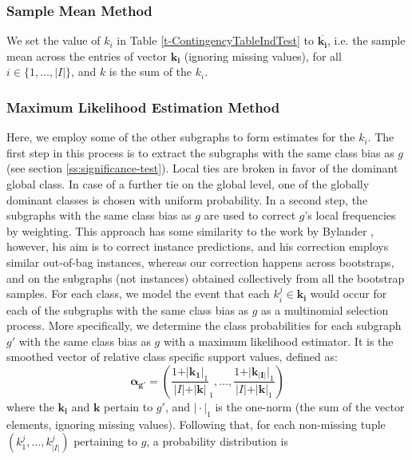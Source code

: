 \documentclass{sig-alternate}
\begin{document}
\subsubsection{Sample Mean Method}
\label{ss:simple-mean}
We set the value of $k_i$ in Table \ref{t-ContingencyTableIndTest} to
$\overline{\mathbf{k_i}}$, i.e. the sample mean
across the entries of vector $\mathbf{k_i}$ (ignoring missing values), for all $i \in \{1,\ldots,|I|\}$,
and $k$ is the sum of the $k_i$.

\subsubsection{Maximum Likelihood Estimation Method}
\label{ss:MLE}
Here, we employ some of the other subgraphs to form estimates for the $k_i$.
The first step in this process is to extract the subgraphs with the same class
bias as $g$ (see section \ref{ss:significance-test}).  Local ties are broken in
favor of the dominant global class. In case of a further tie on the global
level, one of the globally dominant classes is chosen with uniform probability.
In a second step, the subgraphs with the same class bias as $g$ are used to correct
$g$'s local frequencies by weighting. This approach has some similarity to the
work by Bylander \cite{bylander02estimating}, however, his aim is to correct
instance predictions, and his correction employs similar out-of-bag instances,
whereas our correction happens across bootstraps, and on the subgraphs (not
instances) obtained collectively from all the bootstrap samples.  For each
class, we model the event that each $k_i^j \in \mathbf{k_i}$ would occur for
each of the subgraphs with the same class bias as $g$ as a multinomial
selection process.  More specifically, we determine the class probabilities for
each subgraph $g'$ with the same class bias as $g$ with a maximum likelihood
estimator. It is the smoothed vector of relative class specific support values,
defined as:
\begin{equation}
  \mathbf{\alpha_{g'}} = \left(\frac{1+\vert\mathbf{k_1}\vert_1}{\vert I\vert+\vert\mathbf{k}\vert}_1,\ldots,\frac{1+\vert\mathbf{k_{\vert I\vert}}\vert_1}{\vert I\vert+\vert\mathbf{k}\vert_1}\right)
  \label{eqn:mlexpr}
\end{equation}
where the $\mathbf{k_i}$ and $\mathbf{k}$ pertain to $g'$, and $\vert\cdot\vert_1$ is the one-norm (the sum of the vector elements, ignoring missing values). Following that, for
each non-missing tuple $(k_1^j,\ldots,k_{\vert I\vert}^j)$ pertaining to $g$, a probability distribution is
\end{document}
